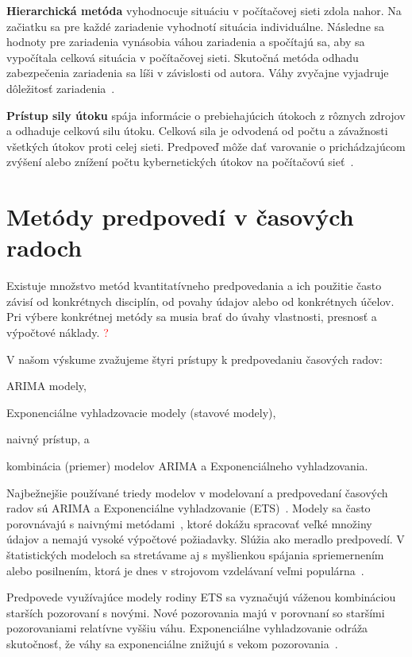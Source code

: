 \documentclass[thesismargins, thesislinespacing, openright, upjsfrontpage, combineabstracts]{rnthesis}
\begin{document}
\textbf{Hierarchická metóda} vyhodnocuje situáciu v počítačovej sieti zdola nahor. Na začiatku sa pre každé zariadenie vyhodnotí situácia individuálne. Následne sa hodnoty pre  zariadenia vynásobia váhou zariadenia a spočítajú sa, aby sa vypočítala celková situácia v počítačovej sieti. Skutočná metóda odhadu zabezpečenia zariadenia  sa líši v závislosti od autora. Váhy zvyčajne vyjadruje dôležitosť zariadenia~\cite{Husak2018survey}.

\textbf{Prístup sily útoku} spája informácie o prebiehajúcich útokoch z rôznych zdrojov a odhaduje celkovú silu útoku. Celková sila je odvodená od počtu a závažnosti všetkých útokov proti celej sieti. Predpoveď môže dať varovanie o prichádzajúcom zvýšení alebo znížení počtu kybernetických útokov na počítačovú sieť~\cite{Husak2018survey}.

\section{Metódy predpovedí v časových radoch}

Existuje množstvo metód kvantitatívneho predpovedania a ich použitie často závisí od konkrétnych disciplín, od povahy údajov alebo od konkrétnych účelov. Pri výbere konkrétnej metódy sa musia brať do úvahy vlastnosti, presnosť a výpočtové náklady. \textcolor{red}{?}

V našom výskume zvažujeme štyri prístupy k predpovedaniu časových radov: 
\begin{compactenum}
    \item ARIMA modely,
    \item Exponenciálne vyhladzovacie modely (stavové modely),
    \item naivný prístup, a 
    \item kombinácia (priemer) modelov ARIMA a Exponenciálneho vyhladzovania.
\end{compactenum}

Najbežnejšie používané triedy modelov v modelovaní a predpovedaní časových radov sú ARIMA a Exponenciálne vyhladzovanie (ETS)~\cite{hyndman2018forecasting}. Modely sa často porovnávajú s naivnými metódami~\cite{brockwell2016introduction, box2015time}, ktoré dokážu spracovať veľké množiny údajov a nemajú vysoké výpočtové požiadavky. Slúžia ako meradlo predpovedí. V štatistických modeloch sa stretávame aj s myšlienkou spájania spriemernením alebo posilnením, ktorá je dnes v strojovom vzdelávaní veľmi populárna~\cite{Husak2018survey}. 

Predpovede využívajúce modely rodiny ETS sa vyznačujú váženou kombináciou starších pozorovaní s novými. Nové pozorovania majú v porovnaní so staršími pozorovaniami relatívne vyššiu váhu. Exponenciálne vyhladzovanie odráža skutočnosť, že váhy sa exponenciálne znižujú s vekom pozorovania~\cite{hyndman2018forecasting,brockwell2016introduction}.
\end{document}
